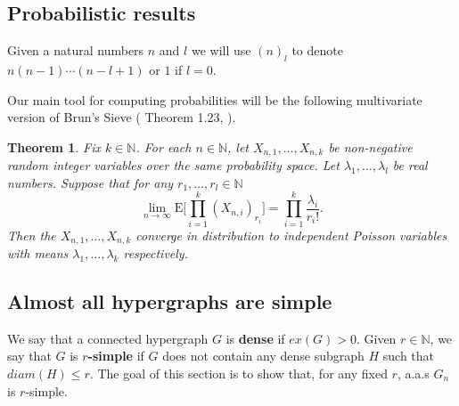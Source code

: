 \documentclass[12pt,notitlepage,a4paper]{article}
\newtheorem{theorem}{Theorem}[section]
\theoremstyle{definition}
\newcommand{\N}{\mathbb{N}}
\newcommand{\Ln}{\lim\limits_{n\to \infty}}
\begin{document}
\subsection{Probabilistic results}

Given a natural numbers $n$ and $l$ we will use 
$(n)_l$ to denote 
$n(n-1)\cdots (n-l+1)$ or $1$ if $l=0$. 

Our main tool for computing probabilities will be
the following multivariate version of Brun's Sieve (
Theorem 1.23, \cite{bollobas2001random}).


\begin{theorem} \label{thm:BrunSieve}
	Fix $k\in \N$. For each 
	$n\in \N$, let $X_{n,1},\dots, X_{n,k}$ be non-negative
	random integer variables over the same
	probability space. Let $\lambda_1,\dots,\lambda_l$ 
	be real numbers. Suppose that for any $r_1,\dots,r_l \in \N$
	\[ 
	\Ln \mathrm{E}\big[
	\prod_{i=1}^{k} (X_{n,i})_{r_i} \big]
	= \prod_{i=1}^{k} \frac{\lambda_i}{r_i !}.	
	\]
	Then the $X_{n,1},\dots,X_{n,k}$ converge in distribution to
	independent Poisson variables with means $\lambda_1,\dots,\lambda_k$ 
	respectively. 
\end{theorem}


\subsection{Almost all hypergraphs are simple}


We say that a connected hypergraph $G$ is \textbf{dense} if
$ex(G)>0$. Given $r\in \N$, we say that $G$ is \textbf{$r$-simple}
if $G$ does not contain any dense subgraph $H$ such that 
$diam(H)\leq r$. The goal of this section is to show that, for any
fixed $r$, a.a.s $G_n$ is $r$-simple.\par
\end{document}
